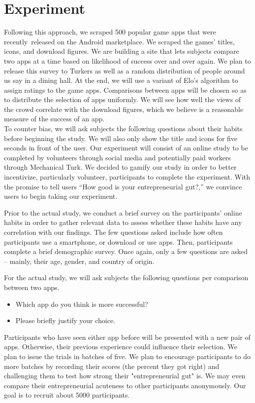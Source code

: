 \section{Experiment}


Following this approach, we scraped 500 popular game apps that were recently released on the Android marketplace. We scraped the games' titles, icons, and download figures. We are building a site that lets subjects compare two apps at a time based on likelihood of success over and over again. We plan to release this survey to Turkers as well as a random distribution of people around us say in a dining hall. At the end, we will use a variant of Elo's algorithm to assign ratings to the game apps. Comparisons between apps will be chosen so as to distribute the selection of apps uniformly. We will see how well the views of the crowd correlate with the download figures, which we believe is a reasonable measure of the success of an app. \\

To counter bias, we will ask subjects the following questions about their habits before beginning the study. We will also only show the title and icons for five seconds in front of the user. Our experiment will consist of an online study to be completed by volunteers through social media and potentially paid workers through Mechanical Turk. We decided to gamify our study in order to better incentivize, particularly volunteer, participants to complete the experiment. With the promise to tell users “How good is your entrepreneurial gut?,” we convince users to begin taking our experiment.

Prior to the actual study, we conduct a brief survey on the participants' online habits in order to gather relevant data to assess whether these habits have any correlation with our findings. The few questions asked include how often participants use a smartphone, or download or use apps. Then, participants complete a brief demographic survey. Once again, only a few questions are asked -- mainly, their age, gender, and country of origin.

For the actual study, we will ask subjects the following questions per comparison between two apps.

\begin{itemize}
\item Which app do you think is more successful?
\item Please briefly justify your choice.
\end{itemize}

Participants who have seen either app before will be presented with a new pair of apps. Otherwise, their previous experience could influence their selection. We plan to issue the trials in batches of five. We plan to encourage participants to do more batches by recording their scores (the percent they got right) and challenging them to test how strong their "entrepreneurial gut" is. We may even compare their entrepreneurial acuteness to other participants anonymously. Our goal is to recruit about 5000 participants.
